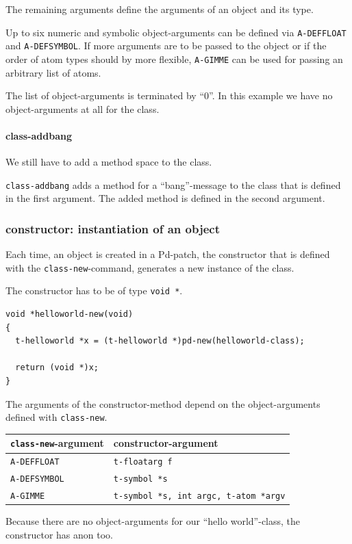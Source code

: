 \documentclass{ppgmus}
\begin{document}
The remaining arguments define the arguments of an object and its type.

Up to six numeric and symbolic object-arguments can be defined via
\verb+A-DEFFLOAT+ and \verb+A-DEFSYMBOL+.
If more arguments are to be passed to the object
or if the order of atom types should by more flexible, 
\verb+A-GIMME+ can be used for passing an arbitrary list of atoms.

The list of object-arguments is terminated by ``0''.
In this example we have no object-arguments at all for the class.

\paragraph{class-addbang}
We still have to add a method space to the class.

\verb+class-addbang+ adds a method for a ``bang''-message to the class that is
defined in the first argument.
The added method is defined in the second argument.


\subsubsection{constructor: instantiation of an object}
Each time, an object is created in a Pd-patch, the
constructor that is defined with the \verb+class-new+-command,
generates a new instance of the class.

The constructor has to be of type \verb+void *+.

\begin{verbatim}
void *helloworld-new(void)
{
  t-helloworld *x = (t-helloworld *)pd-new(helloworld-class);

  return (void *)x;
}
\end{verbatim}


The arguments of the constructor-method depend on the object-arguments
defined with \verb+class-new+.

\begin{tabular}{l|l}
\verb+class-new+-argument&constructor-argument\\
\hline
\verb+A-DEFFLOAT+&\verb+t-floatarg f+ \\
\verb+A-DEFSYMBOL+&\verb+t-symbol *s+ \\
\verb+A-GIMME+&\verb+t-symbol *s, int argc, t-atom *argv+
\end{tabular}

Because there are no object-arguments for our ``hello world''-class,
the constructor has anon too.
\end{document}
